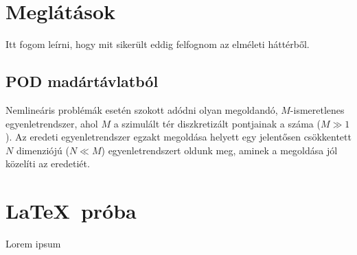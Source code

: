 \author{Szilágyi Gábor \\\vspace{2cm}\\ Konzulens: Dr. Bilicz Sándor}
\date{Budapest, \today}



    \maketitle
    \tableofcontents
    \section{Meglátások}
        Itt fogom leírni, hogy mit sikerült eddig felfognom az elméleti háttérből.
        \subsection{POD madártávlatból}
            Nemlineáris problémák esetén szokott adódni olyan megoldandó, $M$-ismeretlenes egyenletrendszer, ahol $M$ a szimulált tér diszkretizált pontjainak a száma ($M \gg 1$). Az eredeti egyenletrendszer egzakt megoldása helyett egy jelentősen csökkentett $N$ dimenziójú ($N \ll M$) egyenletrendszert oldunk meg, aminek a megoldása jól közelíti az eredetiét.
    \section{\LaTeX~próba}
            Lorem ipsum \cite{PGD}
    
    



 
